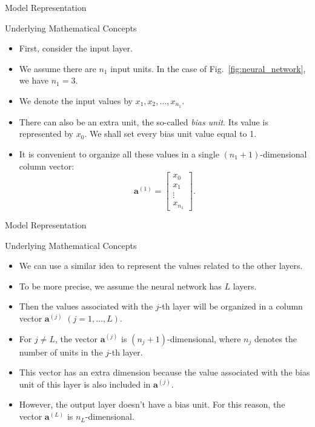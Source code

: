 \documentclass[8pt,american]{beamer}
\begin{document}
\begin{frame}{Model Representation}

\begin{block}{Underlying Mathematical Concepts}
\begin{itemize}
\justifying
\item First, consider the input layer.
\item We assume there are $n_{1}$ input units. In the case of
  Fig.~\ref{fig:neural_network}, we have $n_{1}=3$.
\item We denote the input values by $x_{1},x_{2},\ldots,x_{n_{1}}$.
\item There can also be an extra unit, the so-called \textit{bias unit}. Its
  value is represented by $x_{0}$. We shall set every bias unit value equal to
  1.
\item It is convenient to organize all these values in a single
  $\left(n_{1}+1\right)$-dimensional column vector:
  \begin{equation}
  \mathbf{a}^{\left(1\right)}=\begin{bmatrix}x_{0}\\
  x_{1}\\
  \vdots\\
  x_{n_{1}}
  \end{bmatrix}.
  \end{equation}
\end{itemize}
\end{block}

\end{frame}

\begin{frame}{Model Representation}

\begin{block}{Underlying Mathematical Concepts}
\begin{itemize}
\justifying
\item We can use a similar idea to represent the values related to the other
  layers.
\item To be more precise, we assume the neural network has $L$ layers.
\item Then the values associated with the $j$-th layer will be organized in a
  column vector $\mathbf{a}^{\left(j\right)}$ $\left(j=1,\ldots,L\right)$.
\item For $j\neq L$, the vector $\mathbf{a}^{\left(j\right)}$ is
  $\left(n_{j}+1\right)$-dimensional, where $n_{j}$ denotes the number of units
  in the $j$-th layer.
\item This vector has an extra dimension because the value associated with the
  bias unit of this layer is also included in $\mathbf{a}^{\left(j\right)}$.
\item However, the output layer doesn't have a bias unit. For this reason, the
  vector $\mathbf{a}^{\left(L\right)}$ is $n_{L}$-dimensional.
\end{itemize}
\end{block}

\end{frame}
\end{document}
